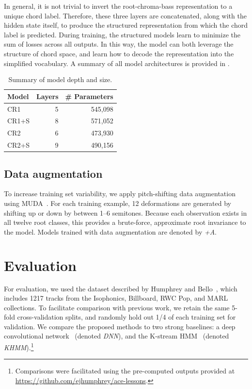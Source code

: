 \documentclass{article}
\begin{document}
In general, it is not trivial to invert the root-chroma-bass representation to a unique chord label.
Therefore, these three layers are concatenated, along with the hidden state itself, to produce the structured representation from which the chord label is predicted.
During training, the structured models learn to minimize the sum of losses across all outputs.
In this way, the model can both leverage the structure of chord space, and learn how to decode the representation into the simplified vocabulary.
A summary of all model architectures is provided in .

\begin{table}[t]
    \centering
    \caption{Summary of model depth and size.\label{tab:models}}
    \begin{tabular}{lrr}
        \toprule
        Model   & Layers & \# Parameters\\
        \midrule
        CR1     & 5 & 545,098\\
        CR1+S   & 8 & 571,052\\
        CR2     & 6 & 473,930\\
        CR2+S   & 9 & 490,156\\
        \bottomrule
    \end{tabular}
\end{table}


\subsection{Data augmentation}
\label{sec:muda}
To increase training set variability, we apply pitch-shifting data augmentation using MUDA~\cite{mcfee2015software}.
For each training example, 12 deformations are generated by shifting up or down by between 1--6 semitones.
Because each observation exists in all twelve root classes, this provides a brute-force, approximate root invariance to the model.
Models trained with data augmentation are denoted by \emph{+A}.


\section{Evaluation}

For evaluation, we used the dataset described by Humphrey and Bello~\cite{humphrey2015four}, which includes 1217 tracks from the Isophonics, Billboard, RWC Pop, and MARL collections.
To facilitate comparison with previous work, we retain the same 5-fold cross-validation splits, and randomly hold out 1/4 of each training set for validation.
We compare the proposed methods to two strong baselines: a deep convolutional network~\cite{humphrey2015four} (denoted \emph{DNN}), and the K-stream HMM~\cite{cho2014improved} (denoted \emph{KHMM}).\footnote{Comparisons were facilitated using the pre-computed outputs provided at \url{https://github.com/ejhumphrey/ace-lessons}.}
\end{document}
